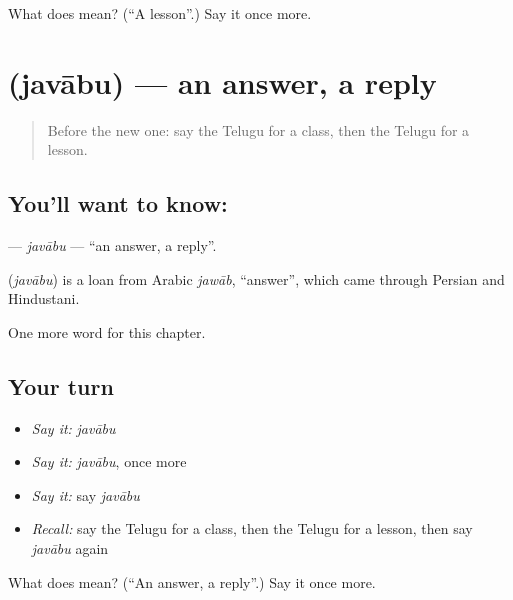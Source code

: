 \begin{tcolorbox}[breakable,colback=teal!4,colframe=teal!35!black,title={Before you move on}]
What does  mean? (\textquotedblleft{}A lesson\textquotedblright{}.) Say it once more.
\end{tcolorbox}
\section[\texorpdfstring{\te{జవాబు} (javābu)}{జవాబు (javābu)}]{ (javābu) — an answer, a reply}

\label{lesson:TE-C274-javabu}



\begin{quote}
Before the new one: say the Telugu for a class, then the Telugu for a lesson.
\end{quote}

\subsection*{You'll want to know: }
\textbf{} — \emph{javābu} — \textquotedblleft{}an answer, a reply\textquotedblright{}.

\begin{cousinweb}
\textbf{} (\emph{javābu}) is a loan from Arabic \emph{jawāb}, \textquotedblleft{}answer\textquotedblright{}, which came through Persian and Hindustani.
\end{cousinweb}

\begin{grammarlens}[title={What you've built}]
One more word for this chapter.
\end{grammarlens}

\subsection*{Your turn}
\begin{itemize}
\raggedright
  \item \emph{Say it:} \emph{javābu}
  \item \emph{Say it:} \emph{javābu}, once more
  \item \emph{Say it:} say \emph{javābu}
  \item \emph{Recall:} say the Telugu for a class, then the Telugu for a lesson, then say \emph{javābu} again
\end{itemize}

\begin{tcolorbox}[breakable,colback=teal!4,colframe=teal!35!black,title={Before you move on}]
What does  mean? (\textquotedblleft{}An answer, a reply\textquotedblright{}.) Say it once more.
\end{tcolorbox}
